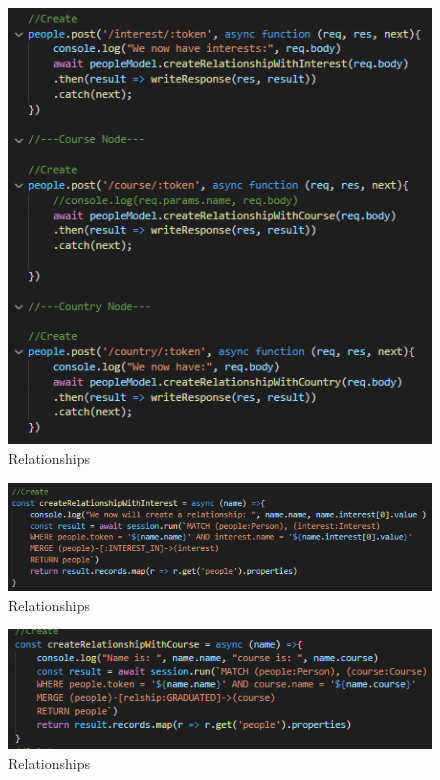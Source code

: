 \begin{figure}[H]
    \centering
    \includegraphics{img/backend5.png}
    \caption{Relationships} 
    \label{fig:my_label}
\end{figure}

\begin{figure}[H]
    \centering
    \includegraphics{img/backend6.png}
    \caption{Relationships} 
    \label{fig:my_label}
\end{figure}

\begin{figure}[H]
    \centering
    \includegraphics{img/backend7.png}
    \caption{Relationships} 
    \label{fig:my_label}
\end{figure}

